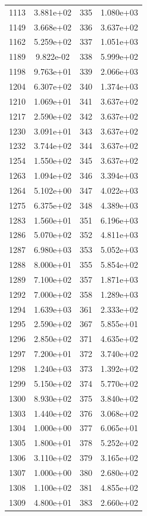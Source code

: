 \documentclass[12pt]{article}
\begin{document}
\begin{longtable}{@{}cccc@{}}
1113 & 3.881e+02 & 335 & 1.080e+03 \\
1149 & 3.668e+02 & 336 & 3.637e+02 \\
1162 & 5.259e+02 & 337 & 1.051e+03 \\
1189 & 9.822e-02 & 338 & 5.999e+02 \\
1198 & 9.763e+01 & 339 & 2.066e+03 \\
1204 & 6.307e+02 & 340 & 1.374e+03 \\
1210 & 1.069e+01 & 341 & 3.637e+02 \\
1217 & 2.590e+02 & 342 & 3.637e+02 \\
1230 & 3.091e+01 & 343 & 3.637e+02 \\
1232 & 3.744e+02 & 344 & 3.637e+02 \\
1254 & 1.550e+02 & 345 & 3.637e+02 \\
1263 & 1.094e+02 & 346 & 3.394e+03 \\
1264 & 5.102e+00 & 347 & 4.022e+03 \\
1275 & 6.375e+02 & 348 & 4.389e+03 \\
1283 & 1.560e+01 & 351 & 6.196e+03 \\
1286 & 5.070e+02 & 352 & 4.811e+03 \\
1287 & 6.980e+03 & 353 & 5.052e+03 \\
1288 & 8.000e+01 & 355 & 5.854e+02 \\
1289 & 7.100e+02 & 357 & 1.871e+03 \\
1292 & 7.000e+02 & 358 & 1.289e+03 \\
1294 & 1.639e+03 & 361 & 2.333e+02 \\
1295 & 2.590e+02 & 367 & 5.855e+01 \\
1296 & 2.850e+02 & 371 & 4.635e+02 \\
1297 & 7.200e+01 & 372 & 3.740e+02 \\
1298 & 1.240e+03 & 373 & 1.392e+02 \\
1299 & 5.150e+02 & 374 & 5.770e+02 \\
1300 & 8.930e+02 & 375 & 3.840e+02 \\
1303 & 1.440e+02 & 376 & 3.068e+02 \\
1304 & 1.000e+00 & 377 & 6.065e+01 \\
1305 & 1.800e+01 & 378 & 5.252e+02 \\
1306 & 3.110e+02 & 379 & 3.165e+02 \\
1307 & 1.000e+00 & 380 & 2.680e+02 \\
1308 & 1.100e+02 & 381 & 4.855e+02 \\
1309 & 4.800e+01 & 383 & 2.660e+02 \\

\end{longtable}
\end{document}
